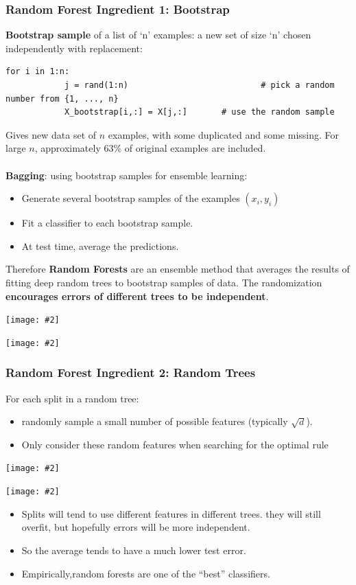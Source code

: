 \documentclass{article}
\def\blu#1{{\color{blu}#1}}
\def\gre#1{{\color{gre}#1}}
\def\red#1{{\color{red}#1}}
\theoremstyle{definition}
\newcommand{\centerfig}[2]{\begin{center}\texttt{[image: \#2]}\end{center}}
\begin{document}
\subsubsection*{Random Forest Ingredient 1: Bootstrap}
\textbf{\blu{Bootstrap sample}} of a list of ‘n’ examples: a new \blu{set of size ‘n’ chosen independently with replacement}:
\begin{lstlisting}[tabsize=2]
		for i in 1:n:
			j = rand(1:n)							# pick a random number from {1, ..., n}
			X_bootstrap[i,:] = X[j,:]		# use the random sample
\end{lstlisting}
Gives new data set of $ n $ examples, with some duplicated and some missing. For large $ n $, approximately 63\% of original examples are included. \\ \\
\textbf{\blu{Bagging}}: using bootstrap samples for ensemble learning:
\begin{itemize}
	\item Generate several \gre{bootstrap samples of the examples $ (x_i,y_i) $}
	\item Fit a \gre{classifier to each bootstrap} sample.
	\item At test time, \gre{average the predictions}.
\end{itemize}
Therefore \textbf{\blu{Random Forests}} are an ensemble method that averages the results of fitting deep \blu{random trees} to \blu{bootstrap samples} of data. The randomization \textbf{\gre{encourages errors of different trees to be independent}}.
\centerfig{0.80}{Pic13}
\centerfig{0.80}{Pic14}

\subsubsection*{Random Forest Ingredient 2: Random Trees}
For \gre{each split} in \blu{a random tree}:
\begin{itemize}
	\item \gre{randomly sample} a small number of possible features (typically $ \sqrt{d} $). 
	\item \red{Only consider these random features} when searching for the optimal rule
\end{itemize}
\centerfig{0.80}{Pic15}
\centerfig{0.80}{Pic16}

\begin{itemize}
	\item Splits will tend to use different features in different trees. they will still overfit, but hopefully errors will be more independent.
	\item So the average tends to \gre{have a much lower test error}.
	\item Empirically,random forests are one of the “best” classifiers.
\end{itemize}
\end{document}
